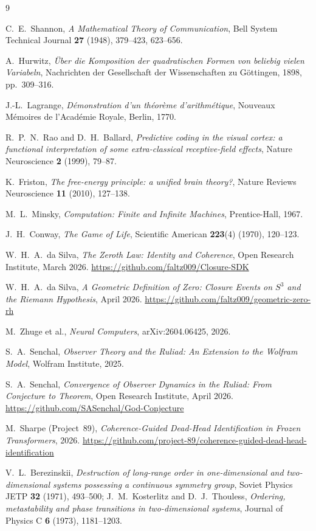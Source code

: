 \documentclass[12pt,a4paper]{article}
\theoremstyle{definition}
\theoremstyle{remark}
\begin{document}
\begin{thebibliography}{9}

C.\ E.\ Shannon,
\textit{A Mathematical Theory of Communication},
Bell System Technical Journal \textbf{27} (1948), 379--423, 623--656.

A.\ Hurwitz,
\textit{\"Uber die Komposition der quadratischen Formen von beliebig vielen
Variabeln},
Nachrichten der Gesellschaft der Wissenschaften zu G\"ottingen, 1898,
pp.\ 309--316.

J.-L.\ Lagrange,
\textit{D\'emonstration d'un th\'eor\`eme d'arithm\'etique},
Nouveaux M\'emoires de l'Acad\'emie Royale, Berlin, 1770.

R.\ P.\ N.\ Rao and D.\ H.\ Ballard,
\textit{Predictive coding in the visual cortex: a functional interpretation
of some extra-classical receptive-field effects},
Nature Neuroscience \textbf{2} (1999), 79--87.

K.\ Friston,
\textit{The free-energy principle: a unified brain theory?},
Nature Reviews Neuroscience \textbf{11} (2010), 127--138.

M.\ L.\ Minsky,
\textit{Computation: Finite and Infinite Machines},
Prentice-Hall, 1967.

J.\ H.\ Conway,
\textit{The Game of Life},
Scientific American \textbf{223}(4) (1970), 120--123.

W.\ H.\ A.\ da Silva,
\textit{The Zeroth Law: Identity and Coherence},
Open Research Institute, March 2026.
\url{https://github.com/faltz009/Closure-SDK}

W.\ H.\ A.\ da Silva,
\textit{A Geometric Definition of Zero: Closure Events on $S^3$ and the
Riemann Hypothesis},
April 2026.
\url{https://github.com/faltz009/geometric-zero-rh}

M.\ Zhuge et al.,
\textit{Neural Computers},
arXiv:2604.06425, 2026.

S.\ A.\ Senchal,
\textit{Observer Theory and the Ruliad: An Extension to the Wolfram Model},
Wolfram Institute, 2025.

S.\ A.\ Senchal,
\textit{Convergence of Observer Dynamics in the Ruliad: From Conjecture to
Theorem},
Open Research Institute, April 2026.
\url{https://github.com/SASenchal/God-Conjecture}

M.\ Sharpe (Project~89),
\textit{Coherence-Guided Dead-Head Identification in Frozen Transformers},
2026.
\url{https://github.com/project-89/coherence-guided-dead-head-identification}

V.\ L.\ Berezinskii,
\textit{Destruction of long-range order in one-dimensional and two-dimensional
systems possessing a continuous symmetry group},
Soviet Physics JETP \textbf{32} (1971), 493--500;
J.\ M.\ Kosterlitz and D.\ J.\ Thouless,
\textit{Ordering, metastability and phase transitions in two-dimensional
systems},
Journal of Physics C \textbf{6} (1973), 1181--1203.

\end{thebibliography}
\end{document}
